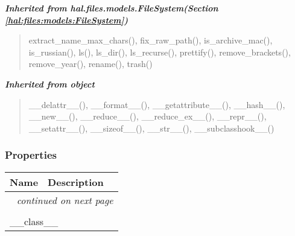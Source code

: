 \large{\textbf{\textit{Inherited from hal.files.models.FileSystem\textit{(Section \ref{hal:files:models:FileSystem})}}}}

\begin{quote}
extract\_name\_max\_chars(), fix\_raw\_path(), is\_archive\_mac(), is\_russian(), ls(), ls\_dir(), ls\_recurse(), prettify(), remove\_brackets(), remove\_year(), rename(), trash()
\end{quote}

\large{\textbf{\textit{Inherited from object}}}

\begin{quote}
\_\_delattr\_\_(), \_\_format\_\_(), \_\_getattribute\_\_(), \_\_hash\_\_(), \_\_new\_\_(), \_\_reduce\_\_(), \_\_reduce\_ex\_\_(), \_\_repr\_\_(), \_\_setattr\_\_(), \_\_sizeof\_\_(), \_\_str\_\_(), \_\_subclasshook\_\_()
\end{quote}


  \subsubsection{Properties}

    \vspace{-1cm}
\hspace{\varindent}\begin{longtable}{|p{\varnamewidth}|p{\vardescrwidth}|l}
\cline{1-2}
\cline{1-2} \centering \textbf{Name} & \centering \textbf{Description}& \\
\cline{1-2}
\endhead\cline{1-2}\multicolumn{3}{r}{\small\textit{continued on next page}}\\\endfoot\cline{1-2}
\endlastfoot\multicolumn{2}{|l|}{\textit{Inherited from object}}\\
\multicolumn{2}{|p{\varwidth}|}{\raggedright \_\_class\_\_}\\
\cline{1-2}
\end{longtable}



